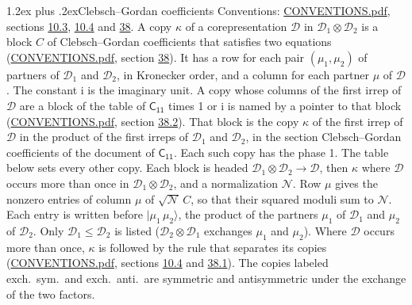 \documentclass[10pt,a4paper]{article}
\makeatletter
\renewcommand\section{\@startsection{section}{1}{\z@}{-3ex plus -1ex minus -.2ex}%
  {1.2ex plus .2ex}{\normalfont\large\sffamily\bfseries\color{parttitle}}}
\numberwithin{equation}{section}
\newcommand{\grp}[1]{\mathsf{#1}}
\newcommand{\iunit}{\mathrm{i}}
\newcommand{\irrprod}{\otimes}
\newcommand{\mult}{\kappa}
\newcommand{\intx}{\mu}
\newcommand{\cgnorm}{\mathcal{N}}
\newcommand{\prodket}[2]{\lvert {#1}\,{#2}\rangle}
\makeatother
\begin{document}
\section{Clebsch--Gordan coefficients}\label{s:clebsch_gordan}
Conventions: \href{../../CONVENTIONS.pdf}{CONVENTIONS.pdf}, sections \href{../../../rotation/CONVENTIONS.pdf\#conv.10.3}{10.3}, \href{../../../rotation/CONVENTIONS.pdf\#conv.10.4}{10.4} and \href{../../CONVENTIONS.pdf\#conv.38}{38}.
\leavevmode\label{n:index.copy}\label{n:matrix.cg.stored}A copy $\mult$ of a corepresentation $\mathcal{D}$ in $\mathcal{D}_1\irrprod\mathcal{D}_2$ is a block $C$ of Clebsch--Gordan coefficients that satisfies two equations (\href{../../CONVENTIONS.pdf}{CONVENTIONS.pdf}, section \href{../../CONVENTIONS.pdf\#conv.38}{38}). \label{n:index.cg}It has a row for each pair $(\intx_1, \intx_2)$ of partners of $\mathcal{D}_1$ and $\mathcal{D}_2$, in Kronecker order, and a column for each partner $\intx$ of $\mathcal{D}$.
The constant $\iunit$ is the imaginary unit.
A copy whose columns of the first irrep of $\mathcal{D}$ are a block of the table of $\grp{C_{11}}$ times 1 or $\iunit$ is named by a pointer to that block (\href{../../CONVENTIONS.pdf}{CONVENTIONS.pdf}, section \href{../../CONVENTIONS.pdf\#conv.38.2}{38.2}). That block is the copy $\mult$ of the first irrep of $\mathcal{D}$ in the product of the first irreps of $\mathcal{D}_1$ and $\mathcal{D}_2$, in the section Clebsch--Gordan coefficients of the document of \href{../../../rotation/data/pdf/C11.pdf}{$\grp{C_{11}}$}. Each such copy has the phase 1. The table below sets every other copy.
Each block is headed $\mathcal{D}_1\irrprod\mathcal{D}_2\to\mathcal{D}$, then $\mult$ where $\mathcal{D}$ occurs more than once in $\mathcal{D}_1\irrprod\mathcal{D}_2$, and a normalization $\cgnorm$. Row $\intx$ gives the nonzero entries of column $\intx$ of $\sqrt{\cgnorm}\,C$, so that their squared moduli sum to $\cgnorm$. \label{n:vector.ket.product}Each entry is written before $\prodket{\intx_1}{\intx_2}$, the product of the partners $\intx_1$ of $\mathcal{D}_1$ and $\intx_2$ of $\mathcal{D}_2$. Only $\mathcal{D}_1 \le \mathcal{D}_2$ is listed ($\mathcal{D}_2\irrprod\mathcal{D}_1$ exchanges $\intx_1$ and $\intx_2$).
Where $\mathcal{D}$ occurs more than once, $\mult$ is followed by the rule that separates its copies (\href{../../CONVENTIONS.pdf}{CONVENTIONS.pdf}, sections \href{../../../rotation/CONVENTIONS.pdf\#conv.10.4}{10.4} and \href{../../CONVENTIONS.pdf\#conv.38.1}{38.1}). \label{n:abbreviation.exchange}The copies labeled exch.\ sym.\ and exch.\ anti.\ are symmetric and antisymmetric under the exchange of the two factors.
\end{document}
